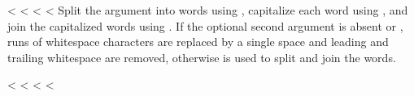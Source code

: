 \documentclass[letterpaper,10pt,english]{sphinxmanual}
\begin{document}
\vspace{5px}

\begin{fulllineitems}
\label{\detokenize{string:string.capwords}}
<%
\pysigstartsignatures
<%
<%
<%
Split the argument into words using , capitalize each word
using , and join the capitalized words using
.  If the optional second argument  is absent
or , runs of whitespace characters are replaced by a single space
and leading and trailing whitespace are removed, otherwise  is used to
split and join the words.

\end{fulllineitems}


\vspace{5px}

\begin{fulllineitems}
\label{\detokenize{index:name_with_underscores}}<%
\pysigstartsignatures
<%
<%
<%
\end{fulllineitems}



\renewcommand{\indexname}{Python Module Index}
\begin{sphinxtheindex}
\let\bigletter\sphinxstyleindexlettergroup
\bigletter{c}
\item\relax{}
\indexspace
\bigletter{s}
\item\relax{}
\end{sphinxtheindex}

\renewcommand{\indexname}{Index}
\printindex
\end{document}
